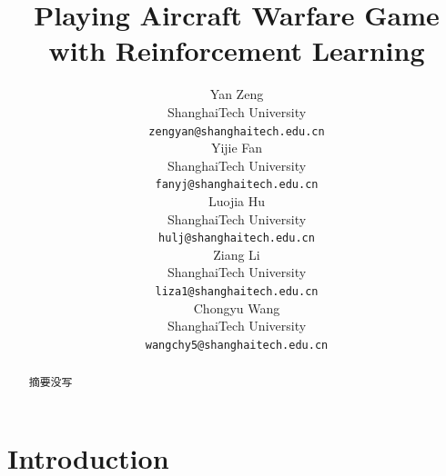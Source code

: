 \documentclass{article}
\title{Playing Aircraft Warfare Game with Reinforcement Learning}
\author{
    Yan Zeng\\
    ShanghaiTech University\\
    \texttt{zengyan@shanghaitech.edu.cn}\\
    \AND
    Yijie Fan\\
    ShanghaiTech University\\
    \texttt{fanyj@shanghaitech.edu.cn}\\
    \AND
    Luojia Hu\\
    ShanghaiTech University\\
    \texttt{hulj@shanghaitech.edu.cn}\\
    \AND
    Ziang Li\\
    ShanghaiTech University\\
    \texttt{liza1@shanghaitech.edu.cn}\\
    \AND
    Chongyu Wang\\
    ShanghaiTech University\\
    \texttt{wangchy5@shanghaitech.edu.cn}\\    
}
\begin{document}
\maketitle

\begin{abstract}
    摘要没写
\end{abstract}


\section{Introduction}





\end{document}
